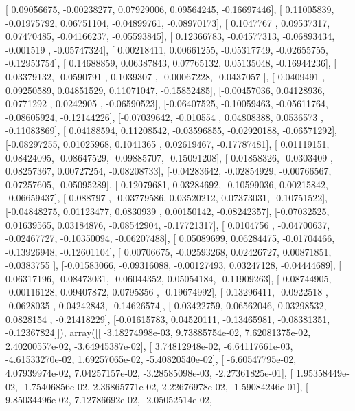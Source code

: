 \documentclass{article}
\begin{document}
       [ 0.09056675, -0.00238277,  0.07929006,  0.09564245, -0.16697446],
       [ 0.11005839, -0.01975792,  0.06751104, -0.04899761, -0.08970173],
       [ 0.1047767 ,  0.09537317,  0.07470485, -0.04166237, -0.05593845],
       [ 0.12366783, -0.04577313, -0.06893434, -0.001519  , -0.05747324],
       [ 0.00218411,  0.00661255, -0.05317749, -0.02655755, -0.12953754],
       [ 0.14688859,  0.06387843,  0.07765132,  0.05135048, -0.16944236],
       [ 0.03379132, -0.0590791 ,  0.1039307 , -0.00067228, -0.0437057 ],
       [-0.0409491 ,  0.09250589,  0.04851529,  0.11071047, -0.15852485],
       [-0.00457036,  0.04128936,  0.0771292 ,  0.0242905 , -0.06590523],
       [-0.06407525, -0.10059463, -0.05611764, -0.08605924, -0.12144226],
       [-0.07039642, -0.010554  ,  0.04808388,  0.0536573 , -0.11083869],
       [ 0.04188594,  0.11208542, -0.03596855, -0.02920188, -0.06571292],
       [-0.08297255,  0.01025968,  0.1041365 ,  0.02619467, -0.17787481],
       [ 0.01119151,  0.08424095, -0.08647529, -0.09885707, -0.15091208],
       [ 0.01858326, -0.0303409 ,  0.08257367,  0.00727254, -0.08208733],
       [-0.04283642, -0.02854929, -0.00766567,  0.07257605, -0.05095289],
       [-0.12079681,  0.03284692, -0.10599036,  0.00215842, -0.06659437],
       [-0.088797  , -0.03779586,  0.03520212,  0.07373031, -0.10751522],
       [-0.04848275,  0.01123477,  0.0830939 ,  0.00150142, -0.08242357],
       [-0.07032525,  0.01639565,  0.03184876, -0.08542904, -0.17721317],
       [ 0.0104756 , -0.04700637, -0.02467727, -0.10350094, -0.06207488],
       [ 0.05089699,  0.06284475, -0.01704466, -0.13926948, -0.12601104],
       [ 0.00706675, -0.02593268,  0.02426727,  0.00871851, -0.0383755 ],
       [-0.01583066, -0.09316088, -0.00127493,  0.03247128, -0.04444689],
       [ 0.06317196, -0.08473031, -0.06044352,  0.05054184, -0.11909263],
       [-0.08744905, -0.00116128,  0.09407872,  0.0795356 , -0.19674992],
       [-0.13296411, -0.0922518 , -0.0628035 ,  0.04242843, -0.14626574],
       [ 0.03422759,  0.06562046,  0.03298532,  0.0828154 , -0.21418229],
       [-0.01615783,  0.04520111, -0.13465981, -0.08381351, -0.12367824]]), array([[ -3.18274998e-03,   9.73885754e-02,   7.62081375e-02,
          2.40200557e-02,  -3.64945387e-02],
       [  3.74812948e-02,  -6.64117661e-03,  -4.61533270e-02,
          1.69257065e-02,  -5.40820540e-02],
       [ -6.60547795e-02,   4.07939974e-02,   7.04257157e-02,
         -3.28585098e-03,  -2.27361825e-01],
       [  1.95358449e-02,  -1.75406856e-02,   2.36865771e-02,
          2.22676978e-02,  -1.59084246e-01],
       [  9.85034496e-02,   7.12786692e-02,  -2.05052514e-02,
\end{document}
